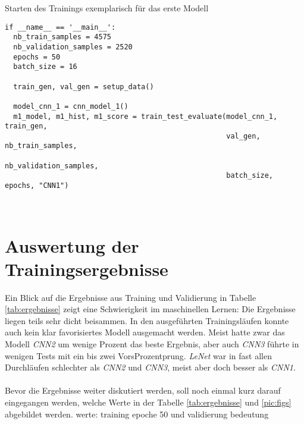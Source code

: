 \begin{listing} [ht]
	\caption{Starten des Trainings exemplarisch für das erste Modell}
	\label{lst:start-training}
	\begin{verbatim}
if __name__ == '__main__':
  nb_train_samples = 4575
  nb_validation_samples = 2520
  epochs = 50
  batch_size = 16

  train_gen, val_gen = setup_data()

  model_cnn_1 = cnn_model_1()
  m1_model, m1_hist, m1_score = train_test_evaluate(model_cnn_1, train_gen,
                                                    val_gen, nb_train_samples,
                                                    nb_validation_samples,
                                                    batch_size, epochs, "CNN1")
	\end{verbatim}
\end{listing} \ \\

\section{Auswertung der Trainingsergebnisse}
Ein Blick auf die Ergebnisse aus Training und Validierung in Tabelle \ref{tab:ergebnisse} zeigt eine Schwierigkeit im maschinellen Lernen: Die Ergebnisse liegen teils sehr dicht beisammen. In den ausgeführten Trainingsläufen konnte auch kein klar favorisiertes Modell ausgemacht werden. Meist hatte zwar das Modell \textit{CNN2} um wenige Prozent das beste Ergebnis, aber auch \textit{CNN3} führte in wenigen Tests mit ein bis zwei  VorsProzentprung. \textit{LeNet} war in fast allen Durchläufen schlechter als \textit{CNN2} und \textit{CNN3}, meist aber doch besser als \textit{CNN1}.\\
\\
Bevor die Ergebnisse weiter diskutiert werden, soll noch einmal kurz darauf eingegangen werden, welche Werte in der Tabelle \ref{tab:ergebnisse} und \ref{pic:figs} abgebildet werden.
werte: training epoche 50 und validierung
bedeutung

